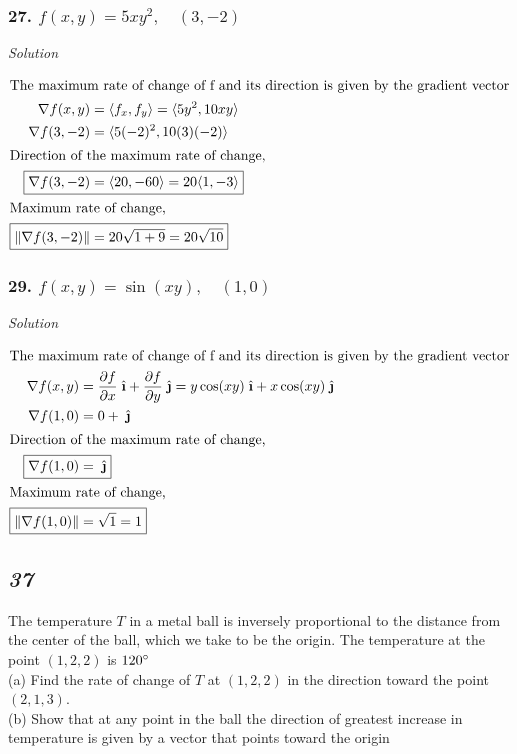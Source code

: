 \documentclass{article}
\newcommand{\ihat}{\;\hat{\textbf{\i}}}
\newcommand{\jhat}{\;\hat{\textbf{\j}}}
\newcommand\vv[1]{\langle #1 \rangle}
\newcommand\mgv[1]{\|#1\|}
\newcommand{\solution}{\centerline{\textit{Solution}}}
\newcommand{\pp}[2]{\displaystyle\frac{\partial #1}{\partial #2}}
\begin{document}
\subsubsection*{27. $f(x,y) = 5xy^2,\quad (3,-2)$}
\solution
\begin{align*}
    \intertext{The maximum rate of change of f and its direction is given by the
    gradient vector}
    \nabla f(x,y) &= \vv{f_x, f_y} = \vv{5y^2, 10xy} \\
    \nabla f(3,-2) &= \vv{5(-2)^2, 10(3)(-2)} \\
    \intertext{Direction of the maximum rate of change,}
    \Aboxed{\nabla f(3,-2) &= \vv{20, -60} = 20\vv{1,-3}} \\
    \intertext{Maximum rate of change,}
    \Aboxed{\mgv{\nabla f(3,-2)} &= 20\sqrt{1 + 9} = 20\sqrt{10}}
\end{align*}
\subsubsection*{29. $f(x,y) = \sin (xy),\quad (1,0)$}
\solution 
\begin{align*}
    \intertext{The maximum rate of change of f and its direction is given by the
    gradient vector}
    \nabla f(x,y) &= \pp f x\ihat + \pp f y\jhat = y\cos(xy)\ihat +
    x\cos(xy)\jhat \\
    \nabla f(1,0) &= 0 + \jhat \\
    \intertext{Direction of the maximum rate of change,}
    \Aboxed{\nabla f(1,0) &= \jhat} \\
    \intertext{Maximum rate of change,}
    \Aboxed{\mgv{\nabla f(1,0)} &= \sqrt 1 = 1}
\end{align*}
\newpage 
\begin{center}
    \subsection*{\textit{37}} 
\end{center}
The temperature $T$ in a metal ball is inversely proportional to the
distance from the center of the ball, which we take to be the origin. The
temperature at the point $(1,2,2)$ is $120\degree$
\vspace{1em} \\
\vspace{1em}
(a) Find the rate of change of $T$ at $(1,2,2)$ in the direction
toward the point $(2,1,3)$. \\
(b) Show that at any point in the ball the direction of greatest
increase in temperature is given by a vector that points toward the origin
\end{document}
